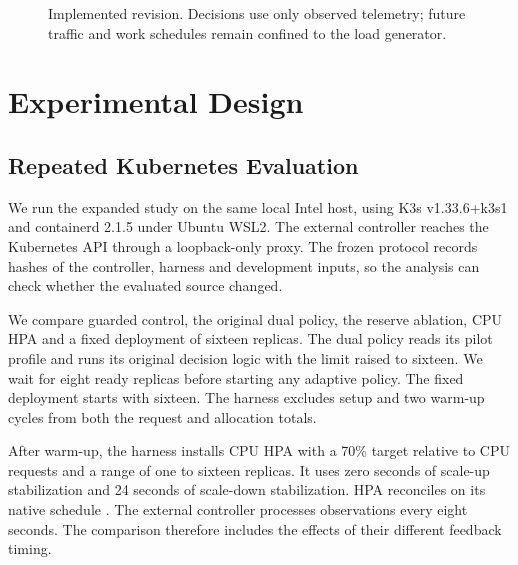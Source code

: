 \documentclass[10pt,twocolumn,a4paper]{article}
\begin{document}
\begin{figure}[t]\centering
{}
\caption{Implemented revision. Decisions use only observed telemetry; future traffic and work schedules remain confined to the load generator.}\label{fig:architecture}\end{figure}

\section{Experimental Design}
\subsection{Repeated Kubernetes Evaluation}
We run the expanded study on the same local Intel host, using K3s v1.33.6+k3s1 and containerd 2.1.5 under Ubuntu WSL2. The external controller reaches the Kubernetes API through a loopback-only proxy. The frozen protocol records hashes of the controller, harness and development inputs, so the analysis can check whether the evaluated source changed.

We compare guarded control, the original dual policy, the reserve ablation, CPU HPA and a fixed deployment of sixteen replicas. The dual policy reads its pilot profile and runs its original decision logic with the limit raised to sixteen. We wait for eight ready replicas before starting any adaptive policy. The fixed deployment starts with sixteen. The harness excludes setup and two warm-up cycles from both the request and allocation totals.

After warm-up, the harness installs CPU HPA with a 70\% target relative to CPU requests and a range of one to sixteen replicas. It uses zero seconds of scale-up stabilization and 24 seconds of scale-down stabilization. HPA reconciles on its native schedule \cite{j01}. The external controller processes observations every eight seconds. The comparison therefore includes the effects of their different feedback timing.
\end{document}
